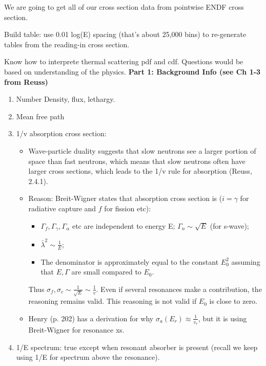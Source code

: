 \documentclass{school-22.211-notes}
\begin{document}
We are going to get all of our cross section data from pointwise ENDF cross section. 

Build table: use 0.01 log(E) spacing (that's about 25,000 bins) to re-generate tables from the reading-in cross section. 


Know how to interprete thermal scattering pdf and cdf. Questions would be based on understanding of the physics. 
\textbf{Part 1: Background Info (see Ch 1-3 from Reuss)}
\begin{enumerate}
\item Number Density, flux, lethargy.  
\item Mean free path
\item 1/v absorption cross section: 
  \begin{itemize}
  \item Wave-particle duality suggests that slow neutrons see a larger portion of space than fast neutrons, which means that slow neutrons often have larger cross sections, which leads to the 1/v rule for absorption (Reuss, 2.4.1). 
  \item Reason: Breit-Wigner states that absorption cross section is ($i = \gamma$ for radiative capture and $f$ for fission etc):
    \begin{itemize}
    \item $\Gamma_f, \Gamma_{\gamma}, \Gamma_{\alpha}$ etc are independent to energy E; $\Gamma_n \sim \sqrt{E}$ (for s-wave);
    \item $\bar{\lambda}^2 \sim \frac{1}{E}$;
    \item The denominator is approximately equal to the constant $E_0^2$ assuming that $E, \Gamma$ are small compared to $E_0$.
    \end{itemize}
    Thus $\sigma_f, \sigma_c \sim \frac{1}{\sqrt{E}} \sim \frac{1}{v}$. Even if several resonances make a contribution, the reasoning remains valid. This reasoning is not valid if $E_0$ is close to zero. 
  \item Henry (p. 202) has a derivation for why $\sigma_a(E_r) \approx \frac{1}{v_r}$, but it is using Breit-Wigner for resonance xs. 
  \end{itemize}
\item 1/E spectrum: true except when resonant absorber is present (recall we keep using 1/E for spectrum above the resonance). 

\end{enumerate}
\end{document}
